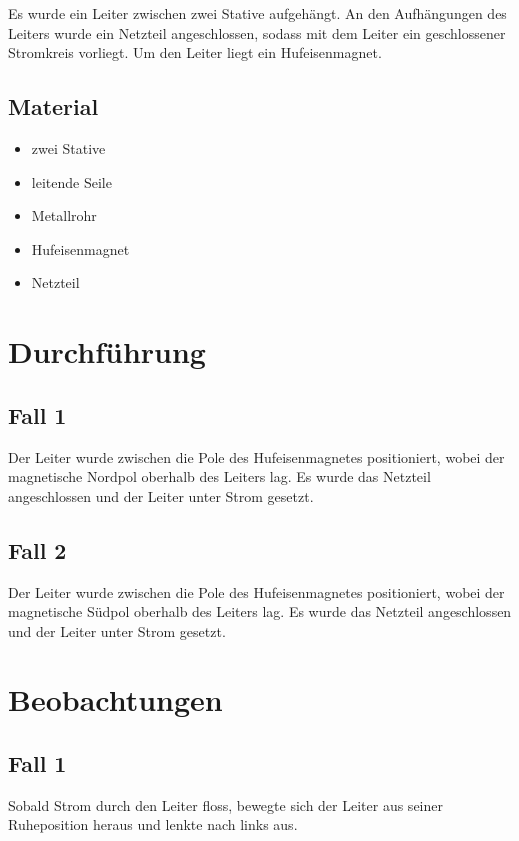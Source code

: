 \documentclass[
	fontsize=11pt,
	paper=a4,
	pagesize=auto,
	parskip=half,
	titlepage=on,
	ngerman
]{scrartcl}
\begin{document}
Es wurde ein Leiter zwischen zwei Stative aufgehängt. An den Aufhängungen des Leiters wurde ein Netzteil angeschlossen, sodass mit dem Leiter ein geschlossener Stromkreis vorliegt. Um den Leiter liegt ein Hufeisenmagnet.

\subsection{Material}

\begin{itemize}
	\item zwei Stative
	\item leitende Seile
	\item Metallrohr
	\item Hufeisenmagnet
	\item Netzteil
\end{itemize}

\section{Durchführung}

\subsection{Fall 1}

Der Leiter wurde zwischen die Pole des Hufeisenmagnetes positioniert, wobei der magnetische Nordpol oberhalb des Leiters lag. Es wurde das Netzteil angeschlossen und der Leiter unter Strom gesetzt.

\subsection{Fall 2}

Der Leiter wurde zwischen die Pole des Hufeisenmagnetes positioniert, wobei der magnetische Südpol oberhalb des Leiters lag. Es wurde das Netzteil angeschlossen und der Leiter unter Strom gesetzt.

\section{Beobachtungen}

\subsection{Fall 1}

Sobald Strom durch den Leiter floss, bewegte sich der Leiter aus seiner Ruheposition heraus und lenkte nach links aus.
\end{document}

